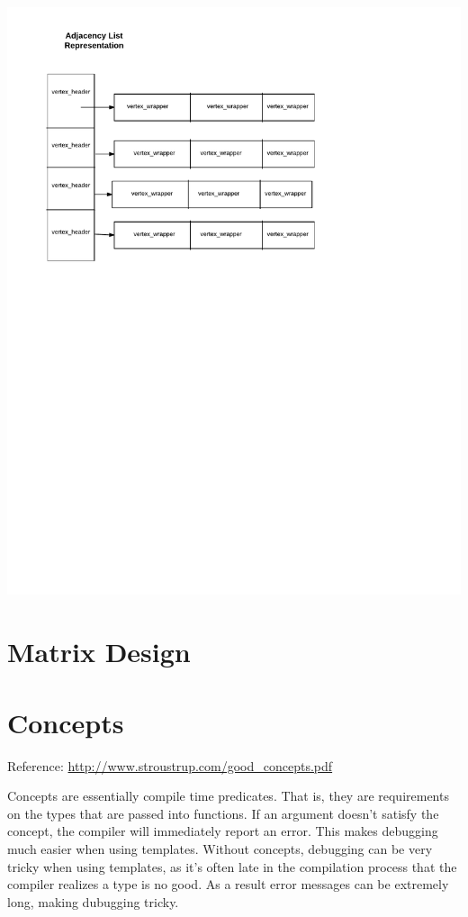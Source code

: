 \documentclass{article}
\begin{document}
\includegraphics{al}

\newpage

\section{Matrix Design}

\section{Concepts}

Reference: \url{http://www.stroustrup.com/good_concepts.pdf}

Concepts are essentially compile time predicates. That is, they are requirements on the types that are passed into functions. If an argument doesn't satisfy the concept, the compiler will immediately report an error. This makes debugging much easier when using templates. Without concepts, debugging can be very tricky when using templates, as it's often late in the compilation process that the compiler realizes a type is no good. As a result error messages can be extremely long, making dubugging tricky. 
\end{document}
